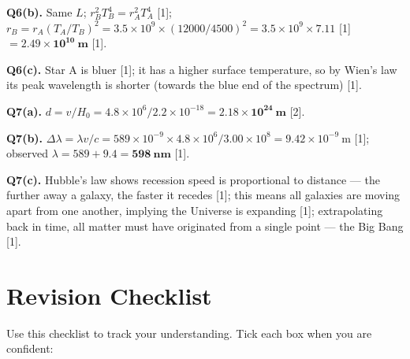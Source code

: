 \begin{markscheme}
\vspace{0.5em}\textbf{Q6(b).} Same $L$; $r_B^2 T_B^4 = r_A^2 T_A^4$ [1]; $r_B = r_A(T_A/T_B)^2 = 3.5\times10^9 \times (12000/4500)^2 = 3.5\times10^9 \times 7.11$ [1] $= \mathbf{2.49\times10^{10}\ \text{m}}$ [1].

\vspace{0.5em}\textbf{Q6(c).} Star A is bluer [1]; it has a higher surface temperature, so by Wien's law its peak wavelength is shorter (towards the blue end of the spectrum) [1].

\vspace{0.5em}\textbf{Q7(a).} $d = v/H_0 = 4.8\times10^6/2.2\times10^{-18} = \mathbf{2.18\times10^{24}\ \text{m}}$ [2].

\vspace{0.5em}\textbf{Q7(b).} $\Delta\lambda = \lambda v/c = 589\times10^{-9}\times4.8\times10^6/3.00\times10^8 = 9.42\times10^{-9}\ \text{m}$ [1]; observed $\lambda = 589 + 9.4 = \mathbf{598\ \text{nm}}$ [1].

\vspace{0.5em}\textbf{Q7(c).} Hubble's law shows recession speed is proportional to distance — the further away a galaxy, the faster it recedes [1]; this means all galaxies are moving apart from one another, implying the Universe is expanding [1]; extrapolating back in time, all matter must have originated from a single point — the Big Bang [1].

\end{markscheme}

\newpage
\section{Revision Checklist}

Use this checklist to track your understanding. Tick each box when you are confident:


